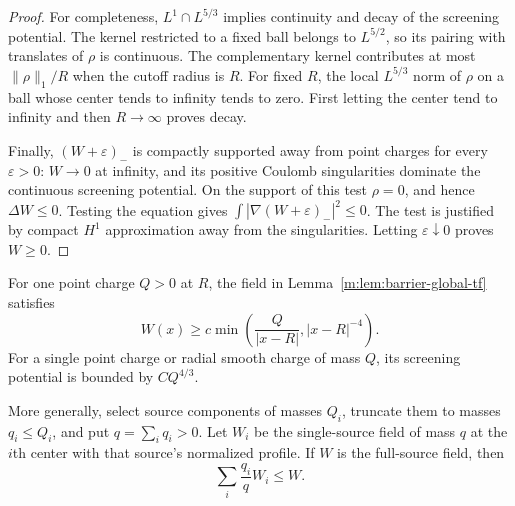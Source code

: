 \begin{proof}
For completeness, $L^1\cap L^{5/3}$ implies continuity and decay of the
screening potential.  The kernel restricted to a fixed ball belongs to
$L^{5/2}$, so its pairing with translates of $\rho$ is continuous.  The
complementary kernel contributes at most $\|\rho\|_1/R$ when the
cutoff radius is $R$.  For fixed $R$, the local $L^{5/3}$ norm of $\rho$
on a ball whose center tends to infinity tends to zero.  First letting
the center tend to infinity and then $R\to\infty$ proves decay.

Finally, $(W+\varepsilon)_-$ is compactly supported away from point
charges for every $\varepsilon>0$: $W\to0$ at infinity, and its positive
Coulomb singularities dominate the continuous screening potential.
On the support of this test $\rho=0$, and hence $\Delta W\le0$.
Testing the equation gives
$\int|\nabla(W+\varepsilon)_-|^2\le0$.
The test is justified by compact $H^1$ approximation away from the
singularities.  Letting $\varepsilon\downarrow0$ proves $W\ge0$.
\end{proof}

\begin{lemma}\label{m:lem:barrier-mixture}
For one point charge $Q>0$ at $R$, the field in
Lemma~\ref{m:lem:barrier-global-tf} satisfies
\begin{equation}\label{m:eq:single-field-lower}
 W(x)\ge c\min\left(\frac{Q}{|x-R|},|x-R|^{-4}\right).
\end{equation}
For a single point charge or radial smooth charge of mass $Q$, its
screening potential is bounded by $CQ^{4/3}$.

More generally, select source components of masses $Q_i$, truncate them
to masses $q_i\le Q_i$, and put $q=\sum_iq_i>0$.  Let $W_i$ be the
single-source field of mass $q$ at the $i$th center with that source's
normalized profile.  If $W$ is the full-source field, then
\begin{equation}\label{m:eq:tf-mixture}
 \sum_i\frac{q_i}{q}W_i\le W.
\end{equation}
\end{lemma}

